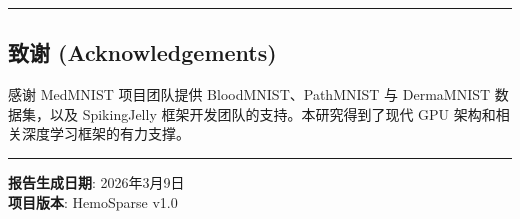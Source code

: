 \documentclass[
]{article}
\begin{document}
\begin{center}\rule{0.5\linewidth}{0.5pt}\end{center}

\subsection{致谢
(Acknowledgements)}\label{ux81f4ux8c22-acknowledgements}

感谢 MedMNIST 项目团队提供 BloodMNIST、PathMNIST 与 DermaMNIST
数据集，以及 SpikingJelly 框架开发团队的支持。本研究得到了现代 GPU
架构和相关深度学习框架的有力支撑。

\begin{center}\rule{0.5\linewidth}{0.5pt}\end{center}

\textbf{报告生成日期}: 2026年3月9日\\
\textbf{项目版本}: HemoSparse v1.0
\end{document}
